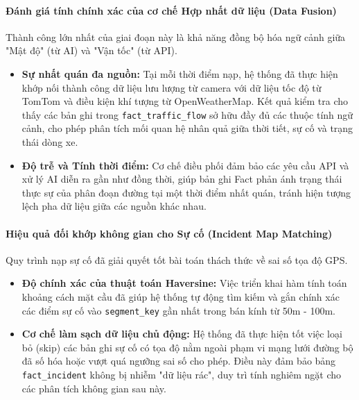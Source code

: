 \paragraph{Đánh giá tính chính xác của cơ chế Hợp nhất dữ liệu (Data Fusion)}
Thành công lớn nhất của giai đoạn này là khả năng đồng bộ hóa ngữ cảnh giữa "Mật độ" (từ AI) và "Vận tốc" (từ API).
\begin{itemize}
    \item \textbf{Sự nhất quán đa nguồn:} Tại mỗi thời điểm nạp, hệ thống đã thực hiện khớp nối thành công dữ liệu lưu lượng từ camera với dữ liệu tốc độ từ TomTom và điều kiện khí tượng từ OpenWeatherMap. Kết quả kiểm tra cho thấy các bản ghi trong \texttt{fact\_traffic\_flow} sở hữu đầy đủ các thuộc tính ngữ cảnh, cho phép phân tích mối quan hệ nhân quả giữa thời tiết, sự cố và trạng thái dòng xe.
    \item \textbf{Độ trễ và Tính thời điểm:} Cơ chế điều phối đảm bảo các yêu cầu API và xử lý AI diễn ra gần như đồng thời, giúp bản ghi Fact phản ánh trạng thái thực sự của phân đoạn đường tại một thời điểm nhất quán, tránh hiện tượng lệch pha dữ liệu giữa các nguồn khác nhau.
\end{itemize}

\paragraph{Hiệu quả đối khớp không gian cho Sự cố (Incident Map Matching)}
Quy trình nạp sự cố đã giải quyết tốt bài toán thách thức về sai số tọa độ GPS.
\begin{itemize}
    \item \textbf{Độ chính xác của thuật toán Haversine:} Việc triển khai hàm tính toán khoảng cách mặt cầu đã giúp hệ thống tự động tìm kiếm và gắn chính xác các điểm sự cố vào \texttt{segment\_key} gần nhất trong bán kính từ 50m - 100m. 
    \item \textbf{Cơ chế làm sạch dữ liệu chủ động:} Hệ thống đã thực hiện tốt việc loại bỏ (skip) các bản ghi sự cố có tọa độ nằm ngoài phạm vi mạng lưới đường bộ đã số hóa hoặc vượt quá ngưỡng sai số cho phép. Điều này đảm bảo bảng \texttt{fact\_incident} không bị nhiễm "dữ liệu rác", duy trì tính nghiêm ngặt cho các phân tích không gian sau này.
\end{itemize}

